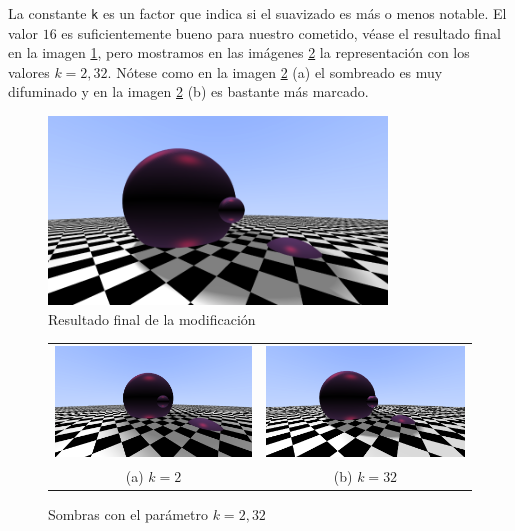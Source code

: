 La constante \verb|k| es un factor que indica si el suavizado es más o menos notable. El valor $16$ es suficientemente bueno para nuestro cometido, véase el resultado final en la imagen \ref{fig:sombras-final}, pero mostramos en las imágenes \ref{fig:sombras-k} la representación con los valores $k=2,32$. Nótese como en la imagen \ref{fig:sombras-k} (a) el sombreado es muy difuminado y en la imagen \ref{fig:sombras-k} (b) es bastante más marcado.

\begin{figure} [ht]
    \centering
    \includegraphics[width=9cm]{img/C9/sombras-final.png}
    \caption{Resultado final de la modificación}
    \label{fig:sombras-final}
\end{figure}


\begin{figure}[ht]
    \centering
    \begin{tabular}{cc}
        \includegraphics[width=7cm]{img/C9/sombras-k-2.png} &
      \includegraphics[width=7cm]{img/C9/sombras-k-32.png} \\    
    (a) $k=2$ & (b) $k=32$  \\
    \end{tabular}
    \caption{Sombras con el parámetro $k=2,32$}
    \label{fig:sombras-k}
\end{figure}

